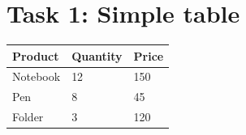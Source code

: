 \documentclass{article}
\begin{document}
\section*{Task 1: Simple table}

\begin{tabular}{lll}
\hline
Product & Quantity & Price \\
\hline
Notebook & 12 & 150 \\
Pen & 8 & 45 \\
Folder & 3 & 120 \\
\hline
\end{tabular}
\end{document}
